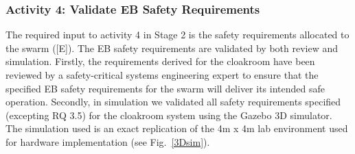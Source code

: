 \documentclass[runningheads]{llncs}
\begin{document}
\subsubsection*{Activity 4: Validate EB Safety Requirements}

The required input to activity 4 in Stage 2 is the safety requirements allocated to the swarm ([E]). 
The EB safety requirements are validated by both review and simulation.
Firstly, the requirements derived for the cloakroom have been reviewed by a safety-critical systems engineering expert to ensure that the specified EB safety requirements for the swarm will deliver its intended safe operation. 
Secondly, in simulation we validated all safety requirements specified (excepting RQ 3.5) for the cloakroom system using the Gazebo 3D simulator. 
The simulation used is an exact replication of the 4m x 4m lab environment used for hardware implementation (see Fig.~\ref{3Dsim}). 




\end{document}
